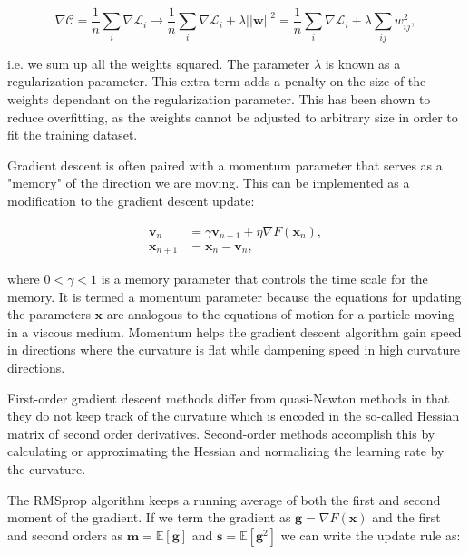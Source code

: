 \begin{equation}
 \nabla \mathcal{C} = \frac{1}{n} \sum_i \nabla \mathcal{L}_i
    \rightarrow \frac{1}{n} \sum_i \nabla \mathcal{L}_i
    + \lambda \left| \left| \bm{w} \right| \right|^2
    = \frac{1}{n} \sum_i \nabla \mathcal{L}_i
    + \lambda \sum_{ij} w_{ij}^2 , 
\end{equation}

i.e. we sum up all the weights squared.
The parameter $\lambda$ is known as a regularization parameter.
This extra term adds a penalty on the size of the weights
dependant on the regularization parameter. This has
been shown to reduce overfitting, as the weights
cannot be adjusted to arbitrary size in order
to fit the training dataset.
\par
Gradient descent is often paired with a momentum parameter
that serves as a "memory" of the direction we are moving.
This can be implemented as a modification to the
gradient descent update:

\begin{equation}
    \begin{split}
        \bm{v}_n &= \gamma \bm{v}_{n-1} + \eta \nabla F(\bm{x}_n) , \\
        \bm{x}_{n+1} &= \bm{x}_n - \bm{v}_n ,
    \end{split}
\end{equation}

where $0 < \gamma < 1$ is a memory parameter
that controls the time scale for the memory.
It is termed a momentum parameter because the equations
for updating the parameters $\bm{x}$ are analogous to
the equations of motion for a particle moving
in a viscous medium. Momentum helps the gradient descent
algorithm gain speed in directions where the curvature
is flat while dampening speed in high curvature directions.
\par
First-order gradient descent methods differ from quasi-Newton methods
in that they do not keep track of the curvature which is encoded
in the so-called Hessian matrix of second order derivatives.
Second-order methods accomplish this by calculating or approximating
the Hessian and normalizing the learning rate by the curvature.
\par
The RMSprop algorithm keeps a running average of both the
first and second moment of the gradient. If we term
the gradient as $\bm{g} = \nabla F(\bm{x})$
and the first and second orders as
$\bm{m} = \mathbb{E}[\bm{g}]$ and $\bm{s} = \mathbb{E}[\bm{g}^2]$
we can write the update rule as:

